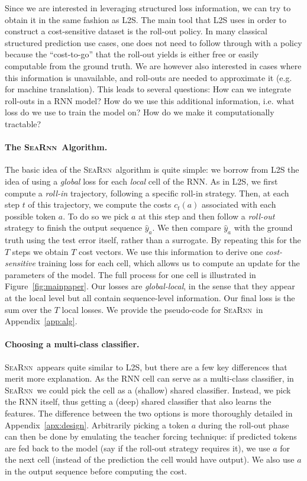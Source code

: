 \documentclass{article}
\newcommand{\SEARNN}{\textsc{SeaRnn}}
\begin{document}
	Since we are interested in leveraging structured loss information, we can try to obtain it in the same fashion as L2S.
	The main tool that L2S uses in order to construct a cost-sensitive dataset is the roll-out policy.
	In many classical structured prediction use cases, one does not need to follow through with a policy because the ``cost-to-go'' that the roll-out yields is either free or easily computable from the ground truth.
	We are however also interested in cases where this information is unavailable, and roll-outs are needed to approximate it (e.g. for machine translation).
	This leads to several questions: How can we integrate roll-outs in a RNN model? How do we use this additional information, i.e. what loss do we use to train the model on? How do we make it computationally tractable?

	\vspace{-1mm}
	\paragraph{The \SEARNN\ Algorithm.}
    The basic idea of the \SEARNN\ algorithm is quite simple: we borrow from L2S the idea of using a \emph{global} loss for each \emph{local} cell of the RNN.
	As in L2S, we first compute a \emph{roll-in} trajectory, following a specific roll-in strategy.
	Then, at each step $t$ of this trajectory, we compute the costs $c_t(a)$ associated with each possible token $a$.
	To do so we pick $a$ at this step and then follow a \emph{roll-out} strategy to finish the output sequence $\hat{y}_a$.
	We then compare $\hat{y}_a$ with the ground truth using the test error itself, rather than a surrogate.
	By repeating this for the $T$ steps we obtain $T$ cost vectors.
	We use this information to derive one \emph{cost-sensitive} training loss for each cell, which allows us to compute an update for the parameters of the model.
	The full process for one cell is illustrated in Figure~\ref{fig:mainpaper}.
	Our losses are \emph{global-local}, in the sense that they appear at the local level but all contain sequence-level information.
	Our final loss is the sum over the $T$ local losses.
	We provide the pseudo-code for \SEARNN\ in Appendix~\ref{app:alg}.

	\vspace{-1mm}
	\paragraph{Choosing a multi-class classifier.}
	\SEARNN\ appears quite similar to L2S, but there are a few key differences that merit more explanation.
	As the RNN cell can serve as a multi-class classifier, in \SEARNN\ we could pick the cell as a (shallow) shared classifier.
	Instead, we pick the RNN itself, thus getting a (deep) shared classifier that also learns the features.
	The difference between the two options is more thoroughly detailed in Appendix~\ref{apx:design}.
	Arbitrarily picking a token $a$ during the roll-out phase can then be done by emulating the teacher forcing technique: if predicted tokens are fed back to the model (say if the roll-out strategy requires it), we use $a$ for the next cell (instead of the prediction the cell would have output).
	We also use $a$ in the output sequence before computing the cost.
\end{document}
